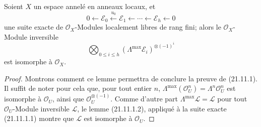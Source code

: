 \begin{lemma}[21.11.1.2]
\label{IV.21.11.1.2}
Soient $X$ un espace annelé en anneaux locaux, et
\[
  0\leftarrow\mathscr E_0\xleftarrow{u_0}\mathscr E_1
  \leftarrow\cdots\leftarrow\mathscr E_h\leftarrow0
\]
une suite exacte de $\mathcal O_X$-Modules localement libres de rang fini; alors le
$\mathcal O_X$-Module inversible
\[
  \bigotimes_{0\leq i\leq h}
  (\Lambda^{\max}\mathscr E_i)^{\otimes(-1)^i}
\]
est isomorphe à $\mathcal O_X$.
\end{lemma}

\begin{proof}
Montrons comment ce lemme permettra de conclure la preuve de (21.11.1). Il suffit de
noter pour cela que, pour tout entier $n$,
$\Lambda^{\max}(\mathcal O_U^n)=\Lambda^n\mathcal O_U^n$ est isomorphe à
$\mathcal O_U$, ainsi que $\mathcal O_U^{\otimes(-1)}$. Comme d'autre part
$\Lambda^{\max}\mathscr L=\mathscr L$ pour tout $\mathcal O_U$-Module inversible
$\mathscr L$, le lemme (21.11.1.2), appliqué à la suite exacte (21.11.1.1) montre
que $\mathscr L$ est isomorphe à $\mathcal O_U$.


\end{proof}
